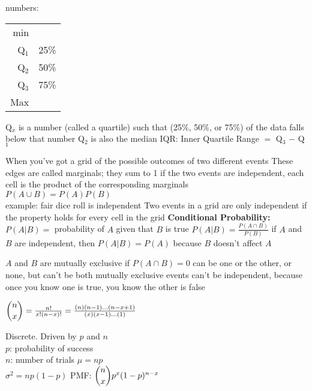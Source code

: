 \documentclass{article}
\begin{document}
\begin{multicols*}{2}
\begin{outline}[compactitem]
   numbers:
    \\\begin{tabular}{r l}
    min &      \\
    Q$_1$  & 25\% \\
    Q$_2$  & 50\% \\
    Q$_3$  & 75\% \\
    Max &      \\
    \end{tabular}
    \1 Q$_x$ is a number (called a quartile) such that (25\%, 50\%, or 75\%) of the data falls below that number
  \1 Q$_2$ is also the median
  \1 IQR: Inner Quartile Range $=$ Q$_3$ $-$ Q$_1$

  \1 When you've got a grid of the possible outcomes of two different events
  \1 These edges are called marginals; they sum to 1
  \1 if the two events are independent, each cell is the product of the corresponding marginals
  \\ $P(A\cup B)=P(A)P(B)$
  \\ example: fair dice roll is independent
  \1 Two events in a grid are only independent if the property holds for every cell in the grid
  \1\textbf{Conditional Probability:} $P(A|B) =$ probability of $A$ given that $B$ is true
    $P(A|B) = \frac{P(A\cap B)}{P(B)}$
  \1 if $A$ and $B$ are independent, then $P(A|B)=P(A)$ because $B$ doesn't affect $A$

  \1 $A$ and $B$ are mutually exclusive if $P(A\cap B)=0$
  \1 can be one or the other, or none, but can't be both\hspace{-0.5em}
  \1 mutually exclusive events can't be independent, because once you know one is true, you know the other is false

  \1 $\dbinom{n}{x}=\frac{n!}{x!(n-x)!}=\frac{(n)(n-1)\ldots(n-x+1)}{(x)(x-1)\ldots(1)}$

  \1 Discrete. Driven by $p$ and $n$
  \\ $p$: probability of success
  \\ $n$: number of trials
  \1 $\mu = np$
  \\ $\sigma^2 = np(1-p)$
  \1 PMF: $\dbinom{n}{x}p^x(1-p)^{n-x}$


\end{outline}
\end{multicols*}
\end{document}
